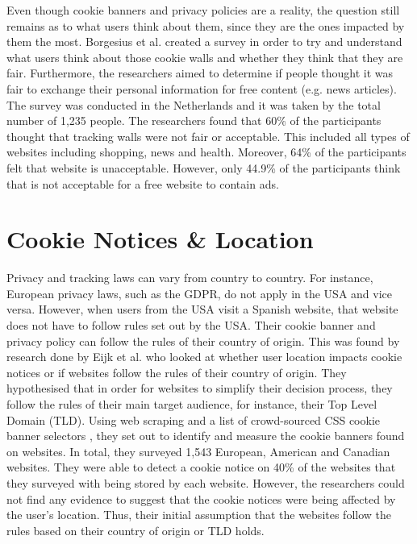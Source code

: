 \documentclass[../main.tex]{subfiles}
\begin{document}
Even though cookie banners and privacy policies are a reality, the question still remains as to what users think about them, since they are the ones impacted by them the most. Borgesius et al. \cite{zuiderveen2017tracking} created a survey in order to try and understand what users think about those cookie walls and whether they think that they are fair. Furthermore, the researchers aimed to determine if people thought it was fair to exchange their personal information for free content (e.g. news articles). The survey was conducted in the Netherlands and it was taken by the total number of 1,235 people. The researchers found that 60\% of the participants thought that tracking walls were not fair or acceptable. This included all types of websites including shopping, news and health. Moreover, 64\% of the participants felt that  website is unacceptable. However, only 44.9\% of the participants think that is not acceptable for a free website to contain ads.

\section{Cookie Notices \& Location}
Privacy and tracking laws can vary from country to country. For instance, European privacy laws, such as the GDPR, do not apply in the USA and vice versa. However, when users from the USA visit a Spanish website, that website does not have to follow rules set out by the USA. Their cookie banner and privacy policy can follow the rules of their country of origin. This was found by research done by Eijk et al. \cite{eijk2019impact} who looked at whether user location impacts cookie notices or if websites follow the rules of their country of origin. They hypothesised that in order for websites to simplify their decision process, they follow the rules of their main target audience, for instance, their Top Level Domain (TLD). Using web scraping and a list of crowd-sourced CSS cookie banner selectors \cite{kladnik}, they set out to identify and measure the cookie banners found on websites. In total, they surveyed 1,543 European, American and Canadian websites. They were able to detect a cookie notice on 40\% of the websites that they surveyed with  being stored by each website. However, the researchers could not find any evidence to suggest that the cookie notices were being affected by the user’s location. Thus, their initial assumption that the websites follow the rules based on their country of origin or TLD holds.
\end{document}
